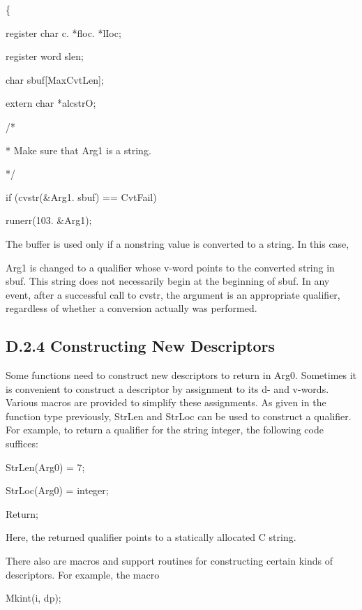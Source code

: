 {\ttfamily\mdseries
\{}

{\ttfamily\mdseries
register char c. *floc. *lIoc;}

{\ttfamily\mdseries
register word slen;}

{\ttfamily\mdseries
char sbuf[MaxCvtLen];}

{\ttfamily\mdseries
extern char *alcstrO;}

{\ttfamily\mdseries
/*}

{\ttfamily\mdseries
* Make sure that Arg1 is a string.}

{\ttfamily\mdseries
*/}

{\ttfamily\mdseries
if (cvstr(\&Arg1. sbuf) == CvtFail)}

{\ttfamily\mdseries
runerr(103. \&Arg1);}

The buffer is used only if a nonstring value is converted to a
string. In this case,

Arg1 is changed to a qualifier whose v-word points to the converted
string in sbuf. This string does not necessarily begin at the
beginning of sbuf. In any event, after a successful call to cvstr, the
argument is an appropriate qualifier, regardless of whether a
conversion actually was performed.

\subsection{D.2.4 Constructing New Descriptors}

Some functions need to construct new descriptors to return in
Arg0. Sometimes it is convenient to construct a descriptor by
assignment to its d- and v-words. Various macros are provided to
simplify these assignments. As given in the function type previously,
StrLen and StrLoc can be used to construct a qualifier. For example,
to return a qualifier for the string
{\textquotedbl}integer{\textquotedbl}, the following code suffices:

{\ttfamily\mdseries
StrLen(Arg0) = 7;}

{\ttfamily\mdseries
StrLoc(Arg0) = {\textquotedbl}integer{\textquotedbl};}

{\ttfamily\mdseries
Return;}

Here, the returned qualifier points to a statically allocated C string.

There also are macros and support routines for constructing certain
kinds of descriptors. For example, the macro

{\ttfamily\mdseries
Mkint(i, dp);}

